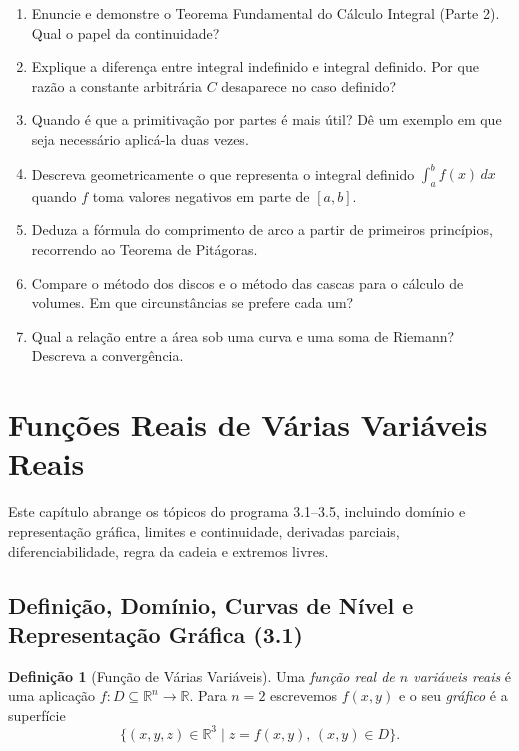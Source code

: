 \documentclass[12pt,a4paper]{article}
\theoremstyle{definition}
\newtheorem{definition}[theorem]{Definição}
\theoremstyle{remark}
\begin{document}
\begin{enumerate}
  \item Enuncie e demonstre o Teorema Fundamental do Cálculo Integral
        (Parte 2). Qual o papel da continuidade?
  \item Explique a diferença entre integral indefinido e integral definido.
        Por que razão a constante arbitrária $C$ desaparece no caso definido?
  \item Quando é que a primitivação por partes é mais útil? Dê um exemplo
        em que seja necessário aplicá-la duas vezes.
  \item Descreva geometricamente o que representa o integral definido
        $\int_a^b f(x)\,dx$ quando $f$ toma valores negativos em parte de $[a,b]$.
  \item Deduza a fórmula do comprimento de arco a partir de primeiros
        princípios, recorrendo ao Teorema de Pitágoras.
  \item Compare o método dos discos e o método das cascas para o cálculo
        de volumes. Em que circunstâncias se prefere cada um?
  \item Qual a relação entre a área sob uma curva e uma soma de Riemann?
        Descreva a convergência.
\end{enumerate}

\newpage
\section{Funções Reais de Várias Variáveis Reais}

Este capítulo abrange os tópicos do programa 3.1--3.5, incluindo domínio e
representação gráfica, limites e continuidade, derivadas parciais,
diferenciabilidade, regra da cadeia e extremos livres.

\subsection{Definição, Domínio, Curvas de Nível e Representação Gráfica (3.1)}

\begin{definition}[Função de Várias Variáveis]
  Uma \emph{função real de $n$ variáveis reais} é uma aplicação
  $f: D \subseteq \mathbb{R}^n \to \mathbb{R}$.
  Para $n=2$ escrevemos $f(x,y)$ e o seu \emph{gráfico} é a superfície
  \[
    \{(x,y,z)\in\mathbb{R}^3 \mid z = f(x,y),\, (x,y)\in D\}.
  \]
\end{definition}
 
\end{document}
